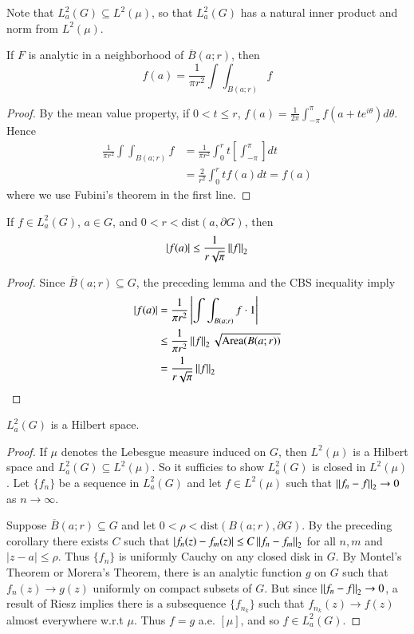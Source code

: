 Note that $L_a^2(G) \subseteq L^2(\mu)$, so that $L_a^2(G)$ has a natural inner product and norm from $L^2(\mu)$.

\begin{lem}
    If $F$ is analytic in a neighborhood of $\overline{B}(a;r)$, then $$f(a) = \frac{1}{\pi r^2}\int\int_{B(a;r)}f$$
\end{lem}
\begin{proof}
    By the mean value property, if $0 < t \leq r$, $f(a) = \frac{1}{2\pi}\int_{-\pi}^{\pi}f(a+te^{i\theta})d\theta$. Hence \begin{align*}
        \frac{1}{\pi r^2}\int\int_{B(a;r)}f &= \frac{1}{\pi r^2}\int_0^rt\left[\int_{-\pi}^{\pi}\right]dt \\
        &= \frac{2}{r^2}\int_0^rtf(a)dt = f(a)
    \end{align*}
    where we use Fubini's theorem in the first line.
\end{proof}

\begin{cor}
    If $f \in L_a^2(G)$, $a \in G$, and $0 < r < \text{dist}(a,\partial G)$, then $$|f(a)| \leq \frac{1}{r\sqrt{\pi}}\left|\left| f\right|\right|_2$$
\end{cor}
\begin{proof}
    Since $\overline{B}(a;r)\subseteq G$, the preceding lemma and the CBS inequality imply \begin{align*}
        |f(a)| &= \frac{1}{\pi r^2}\left|\int\int_{B(a;r)}f\cdot 1\right| \\
        &\leq \frac{1}{\pi r^2}\left|\left| f\right|\right|_2\sqrt{\text{Area}(B(a;r))} \\
        &= \frac{1}{r\sqrt{\pi}}\left|\left| f\right|\right|_2
    \end{align*}
\end{proof}

\begin{prop}
    $L_a^2(G)$ is a Hilbert space.
\end{prop}
\begin{proof}
    If $\mu$ denotes the Lebesgue measure induced on $G$, then $L^2(\mu)$ is a Hilbert space and $L_a^2(G) \subseteq L^2(\mu)$. So it sufficies to show $L_a^2(G)$ is closed in $L^2(\mu)$. Let $\{f_n\}$ be a sequence in $L_a^2(G)$ and let $f \in L^2(\mu)$ such that $\left|\left| f_n-f\right|\right|_2 \rightarrow 0$ as $n\rightarrow \infty$.


    Suppose $\overline{B}(a;r) \subseteq G$ and let $0 < \rho < \text{dist}(B(a;r),\partial G)$. By the preceding corollary there exists $C$ such that $|f_n(z)-f_m(z)|\leq C\left|\left| f_n-f_m\right|\right|_2$ for all $n,m$ and $|z-a| \leq \rho$. Thus $\{f_n\}$ is uniformly Cauchy on any closed disk in $G$. By Montel's Theorem or Morera's Theorem, there is an analytic function $g$ on $G$ such that $f_n(z)\rightarrow g(z)$ uniformly on compact subsets of $G$. But since $\left|\left| f_n-f\right|\right|_2 \rightarrow 0$, a result of Riesz implies there is a subsequence $\{f_{n_k}\}$ such that $f_{n_k}(z)\rightarrow f(z)$ almost everywhere w.r.t $\mu$. Thus $f = g$ a.e. $[\mu]$, and so $f \in L_a^2(G)$.
\end{proof}



